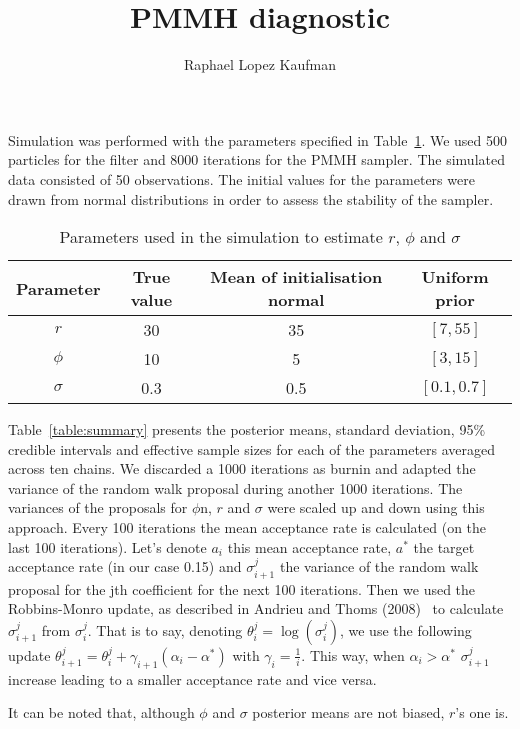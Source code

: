 \documentclass{article}
\title{PMMH diagnostic}
\author{Raphael Lopez Kaufman}
\date{}
\begin{document}
Simulation was performed with the parameters specified in Table~\ref{table:simul}. We used 500 particles for the filter and 8000 iterations for the PMMH sampler. The simulated data consisted of 50 observations. The initial values for the parameters were drawn from normal distributions in order to assess the stability of the sampler.

	\begin{table}[htb]
		\centering
		\vspace{5mm}
		\begin{tabular}{c|c|c|c}
			Parameter & True value &  Mean of initialisation normal &  Uniform prior \\ \hline
			$r$ & 30 & 35 & $[7, 55]$\\ \hline
			$\phi$ & 10 & 5 & $[3, 15]$\\ \hline
			$\sigma$ & 0.3 &  0.5 & $[0.1, 0.7]$\\ \hline
		\end{tabular}
		\caption{Parameters used in the simulation to estimate $r$, $\phi$ and $\sigma$}
		\label{table:simul}
		\vspace{5mm}
	\end{table}

Table~\ref{table:summary} presents the posterior means, standard deviation, 95\% credible intervals and effective sample sizes for each of the parameters averaged across ten chains. We discarded a 1000 iterations as burnin and adapted the variance of the random walk proposal during another 1000 iterations. The variances of the proposals for $\phi$n, $r$ and $\sigma$ were scaled up and down using this approach. Every 100 iterations the mean acceptance rate is calculated (on the last 100 iterations). Let's denote $a_{i}$ this mean acceptance rate, $a^*$ the target acceptance rate (in our case 0.15) and $\sigma_{i+1}^j$ the variance of the random walk proposal for the jth coefficient for the next 100 iterations. Then we used the Robbins-Monro update, as described in Andrieu and Thoms (2008)~\cite{Andrieu2008} to calculate $\sigma_{i+1}^j$  from $\sigma_{i}^j$. That is to say, denoting $\theta_i^j = \log(\sigma_i^j)$, we use the following update $\theta_{i+1}^j =  \theta_i^j + \gamma_{i+1}(\alpha_i-\alpha^*)$ with $\gamma_i = \frac{1}{i}$. This way, when $\alpha_i > \alpha^*$ $\sigma_{i+1}^j$ increase leading to a smaller acceptance rate and vice versa.

It can be noted that, although $\phi$ and $\sigma$ posterior means are not biased, $r$'s one is. 
\end{document}
